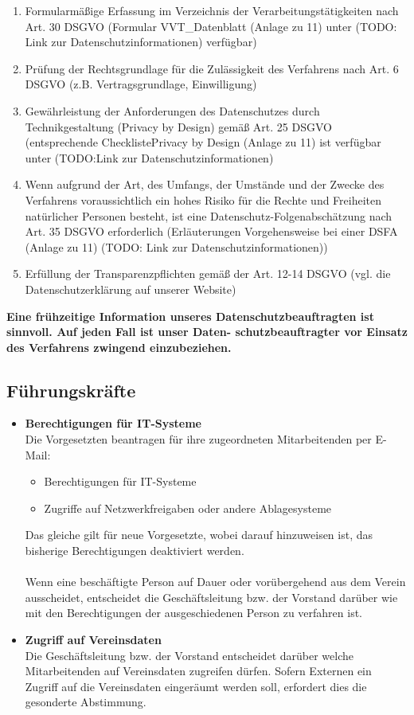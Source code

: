 \documentclass[a4paper, fontsize=11pt]{scrartcl}
\begin{document}
\begin{enumerate}
  \item Formularmäßige Erfassung im Verzeichnis der Verarbeitungstätigkeiten nach Art. 30 DSGVO (Formular VVT\_Datenblatt (Anlage zu 11) unter (TODO: Link zur Datenschutzinformationen) verfügbar)
  \item Prüfung der Rechtsgrundlage für die Zulässigkeit des Verfahrens nach Art. 6 DSGVO (z.B. Vertragsgrundlage, Einwilligung)
  \item Gewährleistung der Anforderungen des Datenschutzes durch Technikgestaltung (Privacy by Design) gemäß Art. 25 DSGVO (entsprechende ChecklistePrivacy by Design (Anlage zu 11) ist verfügbar unter (TODO:Link zur Datenschutzinformationen)
  \item Wenn aufgrund der Art, des Umfangs, der Umstände und der Zwecke des Verfahrens voraussichtlich ein hohes Risiko für die Rechte und Freiheiten natürlicher Personen besteht, ist eine Datenschutz-Folgenabschätzung nach Art. 35 DSGVO erforderlich (Erläuterungen Vorgehensweise bei einer DSFA (Anlage zu 11) (TODO: Link zur Datenschutzinformationen))
  \item Erfüllung der Transparenzpflichten gemäß der Art. 12-14 DSGVO (vgl. die Datenschutzerklärung auf unserer Website)
\end{enumerate}

{\large\textbf{Eine frühzeitige Information unseres Datenschutzbeauftragten ist sinnvoll. Auf jeden Fall ist unser Daten- schutzbeauftragter vor Einsatz des Verfahrens zwingend einzubeziehen.}}

\subsection{Führungskräfte}
\begin{itemize}
  \item \textbf{Berechtigungen für IT-Systeme} \\
  Die Vorgesetzten beantragen für ihre zugeordneten Mitarbeitenden per E-Mail:
  \begin{itemize}
    \item Berechtigungen für IT-Systeme
    \item Zugriffe auf Netzwerkfreigaben oder andere Ablagesysteme
  \end{itemize}
  Das gleiche gilt für neue Vorgesetzte, wobei darauf hinzuweisen ist, das bisherige Berechtigungen deaktiviert werden. \\ \\
  Wenn eine beschäftigte Person auf Dauer oder vorübergehend aus dem Verein ausscheidet, entscheidet die Geschäftsleitung bzw. der Vorstand darüber wie mit den Berechtigungen der ausgeschiedenen Person zu verfahren ist.
  \item \textbf{Zugriff auf Vereinsdaten} \\ Die Geschäftsleitung bzw. der Vorstand entscheidet darüber welche Mitarbeitenden auf Vereinsdaten zugreifen dürfen. Sofern Externen ein Zugriff auf die Vereinsdaten eingeräumt werden soll, erfordert dies die gesonderte Abstimmung.
  
\end{itemize}
\end{document}
